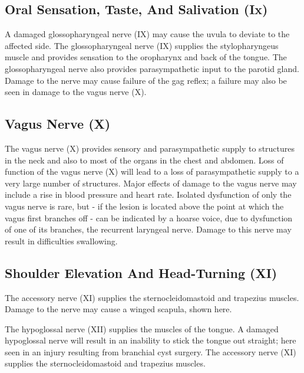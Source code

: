\hypertarget{oral-sensation-taste-and-salivation-ix}{%
\subsection{Oral Sensation, Taste, And Salivation (Ix)}\label{oral-sensation-taste-and-salivation-ix}}

A damaged glossopharyngeal nerve (IX) may cause the uvula to deviate to the affected side.
The glossopharyngeal nerve (IX) supplies the stylopharyngeus muscle and provides sensation to the oropharynx and back of the tongue. The glossopharyngeal nerve also provides parasympathetic input to the parotid gland. Damage to the nerve may cause failure of the gag reflex; a failure may also be seen in damage to the vagus nerve (X).

\hypertarget{vagus-nerve-x}{%
\subsection{Vagus Nerve (X)}\label{vagus-nerve-x}}

The vagus nerve (X) provides sensory and parasympathetic supply to structures in the neck and also to most of the organs in the chest and abdomen. Loss of function of the vagus nerve (X) will lead to a loss of parasympathetic supply to a very large number of structures. Major effects of damage to the vagus nerve may include a rise in blood pressure and heart rate. Isolated dysfunction of only the vagus nerve is rare, but - if the lesion is located above the point at which the vagus first branches off - can be indicated by a hoarse voice, due to dysfunction of one of its branches, the recurrent laryngeal nerve. Damage to this nerve may result in difficulties swallowing.

\hypertarget{shoulder-elevation-and-head-turning-xi}{%
\subsection{Shoulder Elevation And Head-Turning (XI)}\label{shoulder-elevation-and-head-turning-xi}}

The accessory nerve (XI) supplies the sternocleidomastoid and trapezius muscles. Damage to the nerve may cause a winged scapula, shown here.

The hypoglossal nerve (XII) supplies the muscles of the tongue. A damaged hypoglossal nerve will result in an inability to stick the tongue out straight; here seen in an injury resulting from branchial cyst surgery.
The accessory nerve (XI) supplies the sternocleidomastoid and trapezius muscles.

